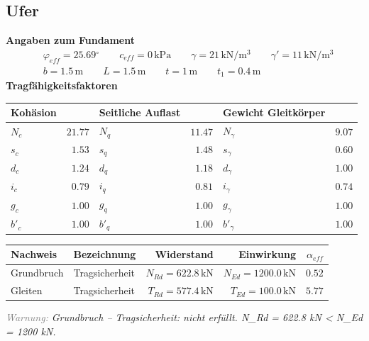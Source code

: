\documentclass[11pt,a4paper]{article}
\newcommand{\hinweis}[2]{\par\noindent\textcolor{gray}{\textit{#1:}} \textit{#2}\par}
\begin{document}
\subsection{Ufer}
\noindent\textbf{Angaben zum Fundament}
\begin{equation*}
\begin{aligned} & \varphi_{eff} = 25.69{}^{\circ} \qquad c_{eff} = 0\,\mathrm{kPa} \qquad \gamma = 21\,\mathrm{kN}/\mathrm{m}^{3} \qquad \gamma' = 11\,\mathrm{kN}/\mathrm{m}^{3} \\ & b = 1.5\,\mathrm{m} \qquad L = 1.5\,\mathrm{m} \qquad t = 1\,\mathrm{m} \qquad t_1 = 0.4\,\mathrm{m} \end{aligned}
\end{equation*}
\noindent\textbf{Tragfähigkeitsfaktoren}
\begin{longtable}{lrlrlr}
\hline
Kohäsion &  & Seitliche Auflast &  & Gewicht Gleitkörper &  \\
\hline
\endhead
$N_{c}$ & $21.77$ & $N_{q}$ & $11.47$ & $N_{\gamma}$ & $9.07$ \\
$s_{c}$ & $1.53$ & $s_{q}$ & $1.48$ & $s_{\gamma}$ & $0.60$ \\
$d_{c}$ & $1.24$ & $d_{q}$ & $1.18$ & $d_{\gamma}$ & $1.00$ \\
$i_{c}$ & $0.79$ & $i_{q}$ & $0.81$ & $i_{\gamma}$ & $0.74$ \\
$g_{c}$ & $1.00$ & $g_{q}$ & $1.00$ & $g_{\gamma}$ & $1.00$ \\
$b'_{c}$ & $1.00$ & $b'_{q}$ & $1.00$ & $b'_{\gamma}$ & $1.00$ \\
\hline
\end{longtable}
\begin{xltabular}{\linewidth}{>{\raggedright\arraybackslash}X>{\raggedright\arraybackslash}Xrrr}
\hline
Nachweis & Bezeichnung & Widerstand & Einwirkung & $\alpha_{eff}$ \\
\hline
\endhead
Grundbruch & Tragsicherheit & $N_{Rd} = 622.8\,\mathrm{kN}$ & $N_{Ed} = 1200.0\,\mathrm{kN}$ & $0.52$ \\
Gleiten & Tragsicherheit & $T_{Rd} = 577.4\,\mathrm{kN}$ & $T_{Ed} = 100.0\,\mathrm{kN}$ & $5.77$ \\
\hline
\end{xltabular}
\hinweis{Warnung}{Grundbruch – Tragsicherheit: nicht erfüllt. N\_Rd = 622.8 kN < N\_Ed = 1200 kN.}
\end{document}
